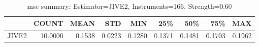 \begin{table}[ht]
\centering
\caption{mse summary: Estimator=JIVE2, Instruments=166, Strength=0.60}
\begin{tabular}{lrrrrrrrr}
\toprule
 & COUNT & MEAN & STD & MIN & 25\% & 50\% & 75\% & MAX \\
\midrule
JIVE2 & 10.0000 & 0.1538 & 0.0223 & 0.1280 & 0.1371 & 0.1481 & 0.1703 & 0.1962 \\
\bottomrule
\end{tabular}
\end{table}
